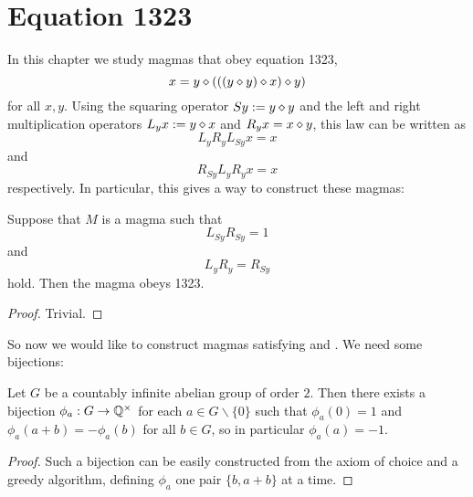 \chapter{Equation 1323}\label{1323-chapter}

In this chapter we study magmas that obey equation 1323,
\begin{equation}\label{1323}
  x = y \diamond (((y \diamond y) \diamond x) \diamond y)
\end{equation}
for all $x,y$.  Using the squaring operator $Sy := y \diamond y$ and the left and right multiplication operators $L_y x := y \diamond x$ and $R_y x = x \diamond y$, this law can be written as
$$ L_y R_y L_{Sy} x = x$$
and
$$ R_{Sy} L_y R_y x = x$$
respectively.  In particular, this gives a way to construct these magmas:

\begin{lemma}\label{1323-construct}  Suppose that $M$ is a magma such that
  \begin{equation}\label{lr}
    L_{Sy} R_{Sy} = 1
   \end{equation}
and
\begin{equation}\label{lr-simp}
  L_{y} R_{y} = R_{Sy}
\end{equation}
hold.  Then the magma obeys 1323.
\end{lemma}

\begin{proof} Trivial.
\end{proof}

 So now we would like to construct magmas satisfying  and .  We need some bijections:

 \begin{lemma}[Bijections]\label{bij}
  Let $G$ be a countably infinite abelian group of order $2$.  Then there exists a bijection $\phi_a: G \to \mathbb{Q}^\times$ for each $a \in G \backslash \{0\}$ such that
 $\phi_a(0) = 1$ and $\phi_a(a+b) = -\phi_a(b)$ for all $b \in G$, so in particular $\phi_a(a)=-1$.
 \end{lemma}

 \begin{proof}
  Such a bijection can be easily constructed from the axiom of choice and a greedy algorithm, defining $\phi_a$ one pair $\{b,a+b\}$ at a time.
 \end{proof}


